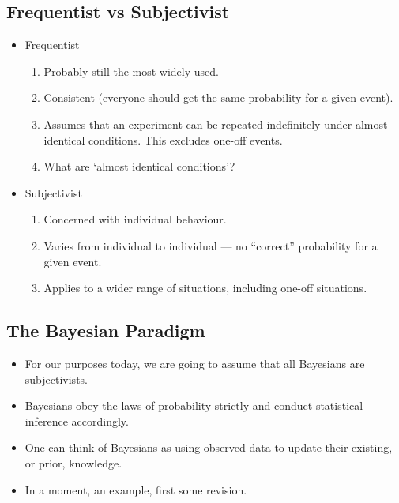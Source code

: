 \subsection*{Frequentist vs Subjectivist}
\begin{itemize}
      \item Frequentist
            \begin{enumerate}
                  \item Probably still the most widely used.
                  \item Consistent (everyone should get the same probability for a given
                        event).
                  \item Assumes that an experiment can be repeated indefinitely under
                        almost identical conditions. This excludes one-off events.
                  \item What are `almost identical conditions'?
            \end{enumerate}
      \item Subjectivist
            \begin{enumerate}
                  \item Concerned with individual behaviour.
                  \item Varies from individual to individual --- no ``correct'' probability for a
                        given event.
                  \item Applies to a wider range of situations, including one-off situations.
            \end{enumerate}
\end{itemize}
\subsection*{The Bayesian Paradigm}
\begin{itemize}
      \item For our purposes today, we are going to assume that all Bayesians are
            subjectivists.
      \item Bayesians obey the laws of probability strictly and conduct statistical
            inference accordingly.
      \item One can think of Bayesians as using observed data to update their
            existing, or prior, knowledge.
      \item In a moment, an example, first some revision.
\end{itemize}
